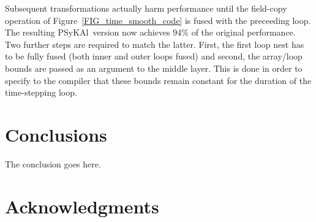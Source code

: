 \documentclass[journal]{IEEEtran}
\newcommand{\psykal}{{PS}y{KA}l\ }
\begin{document}
Subsequent transformations actually harm performance until the
field-copy operation of Figure~\ref{FIG_time_smooth_code} is fused
with the preceeding loop. The resulting \psykal version now achieves
94\% of the original performance. Two further steps are required to
match the latter. First, the first loop nest has to be fully fused
(both inner and outer loops fused) and second, the array/loop bounds
are passed as an argument to the middle layer. This is done in order
to specify to the compiler that these bounds remain constant for the
duration of the time-stepping loop.

%
%







\section{Conclusions}
The conclusion goes here.



\section*{Acknowledgments}
\end{document}
